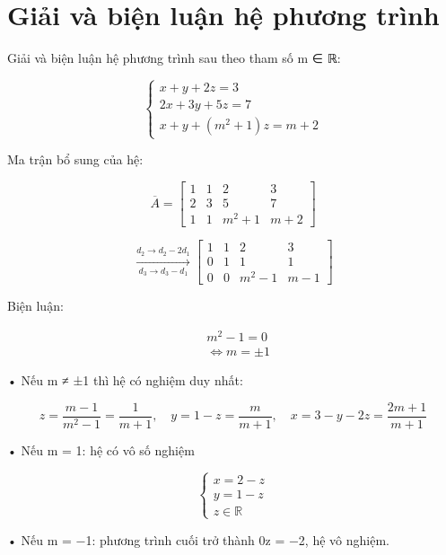 \documentclass[12pt,a4paper]{article}
\begin{document}
\section*{Giải và biện luận hệ phương trình}
Giải và biện luận hệ phương trình sau theo tham số m ∈ ℝ:

\[ \begin{cases}x+y+2z=3\\2x+3y+5z=7\\x+y+\left(m^{2}+1\right)z=m+2\end{cases} \]

Ma trận bổ sung của hệ:

\[ \overline{A}=\left[\begin{array}{ccc|c}1&1&2&3\\2&3&5&7\\1&1&m^{2}+1&m+2\end{array}\right] \]

\[ \xrightarrow[d_{3}\to d_{3}-d_{1}]{d_{2}\to d_{2}-2d_{1}}\left[\begin{array}{ccc|c}1&1&2&3\\0&1&1&1\\0&0&m^{2}-1&m-1\end{array}\right] \]

Biện luận:

\begin{align*}
& m^{2}-1=0 \\
& \Leftrightarrow m=\pm1
\end{align*}

• Nếu m ≠ ±1 thì hệ có nghiệm duy nhất:

\[ z=\frac{m-1}{m^{2}-1}=\frac{1}{m+1},\quad y=1-z=\frac{m}{m+1},\quad x=3-y-2z=\frac{2m+1}{m+1} \]

• Nếu m = 1: hệ có vô số nghiệm

\[ \begin{cases}x=2-z\\y=1-z\\z\in\mathbb{R}\end{cases} \]

• Nếu m = −1: phương trình cuối trở thành 0z = −2, hệ vô nghiệm.
\end{document}
